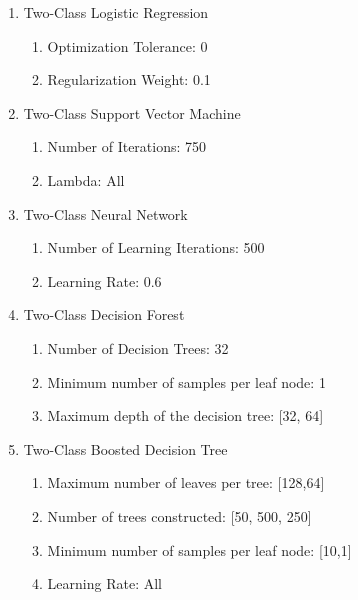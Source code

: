 \begin{enumerate}
    \item{Two-Class Logistic Regression}
    
    \begin{enumerate}
        \item{Optimization Tolerance:} 0
        \item{Regularization Weight:} 0.1
    \end{enumerate}
    
    \item{Two-Class Support Vector Machine}
    
    \begin{enumerate}
        \item{Number of Iterations:} 750
        \item{Lambda:} All
    \end{enumerate}
    
    \item{Two-Class Neural Network}
    
    \begin{enumerate}
        \item{Number of Learning Iterations:} 500
        \item{Learning Rate:} 0.6
    \end{enumerate}
    
    \item{Two-Class Decision Forest}

    \begin{enumerate}
        \item{Number of Decision Trees:} 32
        \item{Minimum number of samples per leaf node:} 1
        \item{Maximum depth of the decision tree:} [32, 64]
    \end{enumerate}
    
    \item{Two-Class Boosted Decision Tree}
    
    \begin{enumerate}
        \item{Maximum number of leaves per tree:} [128,64]
        \item{Number of trees constructed:} [50, 500, 250]
        \item{Minimum number of samples per leaf node:} [10,1]
        \item{Learning Rate:} All
    \end{enumerate}
    
\end{enumerate}


